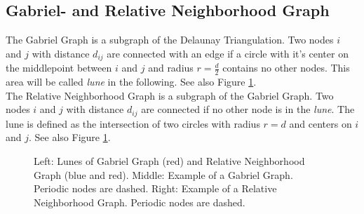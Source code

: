 
\subsection{Gabriel- and Relative Neighborhood Graph}
\label{sec:graphtypes}
    The Gabriel Graph \cite{Gabriel1969} is a subgraph of the
    Delaunay Triangulation. Two nodes \(i\) and \(j\) with distance
    \(d_{ij}\) are connected with an edge if a circle with it's
    center on the middlepoint between \(i\) and \(j\) and radius
    \(r = \frac d 2\) contains no other nodes. This area will be
    called \emph{lune} in the following. See also Figure
    \ref{fig:lunes}.\\
    The Relative Neighborhood Graph \cite{Toussaint1980} is a
    subgraph of the Gabriel Graph. Two nodes \(i\) and \(j\) with
    distance \(d_{ij}\) are connected if no other node is in the
    \emph{lune}. The lune is defined as the intersection of two
    circles with radius \(r = d\) and centers on \(i\) and \(j\).
    See also Figure \ref{fig:lunes}.
    \begin{figure}[htbp]
        \centering
        \subfigure{}
        \caption[Definition of the lunes and examples of the Gabriel
                and Relative Neighborhood Graph]
                {Left: Lunes of Gabriel Graph (red) and Relative
                    Neighborhood Graph (blue and red). Middle:
                    Example of a Gabriel Graph. Periodic nodes are
                    dashed. Right: Example of a Relative
                    Neighborhood Graph. Periodic nodes are dashed.}
        \label{fig:lunes}
    \end{figure}

